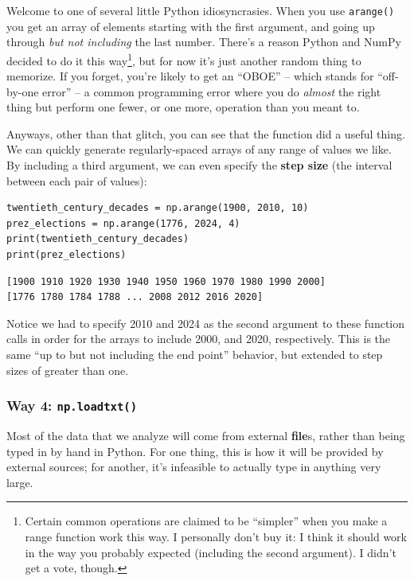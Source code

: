 Welcome to one of several little Python idiosyncrasies. When you use
\texttt{arange()} you get an array of elements starting with the first
argument, and going up through \textit{but not including} the last number.
There's a reason Python and NumPy decided to do it this way\footnote{Certain
common operations are claimed to be ``simpler'' when you make a range function
work this way. I personally don't buy it: I think it should work in the way you
probably expected (including the second argument). I didn't get a vote,
though.}, but for now it's just another random thing to memorize. If you
forget, you're likely to get an ``OBOE'' -- which stands for ``off-by-one
error'' -- a common programming error where you do \textit{almost} the right
thing but perform one fewer, or one more, operation than you meant to.

Anyways, other than that glitch, you can see that the function did a useful
thing. We can quickly generate regularly-spaced arrays of any range of values
we like. By including a third argument, we can even specify the \textbf{step
size} (the interval between each pair of values):

\begin{Verbatim}[fontsize=\small,samepage=true,frame=single,framesep=3mm]
twentieth_century_decades = np.arange(1900, 2010, 10)
prez_elections = np.arange(1776, 2024, 4)
print(twentieth_century_decades)
print(prez_elections)
\end{Verbatim}

\begin{Verbatim}[fontsize=\small,samepage=true,frame=leftline,framesep=5mm,framerule=1mm]
[1900 1910 1920 1930 1940 1950 1960 1970 1980 1990 2000]
[1776 1780 1784 1788 ... 2008 2012 2016 2020]
\end{Verbatim}

Notice we had to specify 2010 and 2024 as the second argument to these function
calls in order for the arrays to include 2000, and 2020, respectively. This is
the same ``up to but not including the end point'' behavior, but extended to
step sizes of greater than one.

\subsubsection{Way 4: \texttt{np.loadtxt()}}


Most of the data that we analyze will come from external \textbf{file}s, rather
than being typed in by hand in Python. For one thing, this is how it will be
provided by external sources; for another, it's infeasible to actually type in
anything very large.

